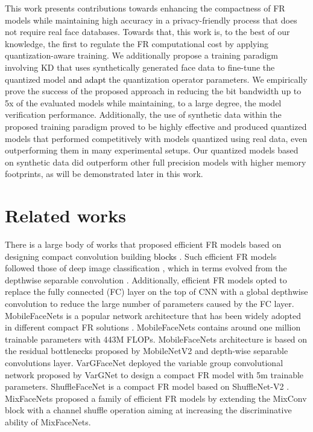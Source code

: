\documentclass[a4paper,conference]{IEEEtran}
\begin{document}
This work presents contributions towards enhancing the compactness of FR models while maintaining high accuracy in a privacy-friendly process that does not require real face databases. 
Towards that, this work is, to the best of our knowledge, the first to regulate the FR computational cost by applying quantization-aware training.
We additionally propose a training paradigm involving KD that uses synthetically generated face data to fine-tune the quantized model \textcolor{black}{and adapt} the quantization operator parameters.
We empirically prove the success of the proposed approach in reducing the bit bandwidth up to 5x of the evaluated models while maintaining, to a large degree, the model verification performance. 
Additionally, the use of synthetic data within the proposed training paradigm proved to be highly effective and produced quantized models that performed competitively with models quantized using real data, even outperforming them in many experimental setups.
Our quantized models based on synthetic data did outperform other full precision models with higher memory footprints, as will be demonstrated later in this work.







\vspace{-2mm}
\section{Related works}
\vspace{-1mm}
There is a large body of works that proposed efficient FR models based on designing compact convolution building \textcolor{black}{blocks} \cite{mobilefacenet,shufflefacenet,mixfacenet,vargfacenet}.  
Such efficient FR models followed those of deep image classification \cite{mixnet,mobilenetv2,shufflenetv2}, which in terms evolved from the depthwise separable convolution \cite{xception}. 
Additionally, efficient FR models \cite{mobilefacenet,shufflefacenet,mixfacenet,vargfacenet} opted to replace the fully connected (FC) layer on the top of CNN with a global depthwise convolution to reduce the large number of parameters caused by the FC layer.
MobileFaceNets \cite{mobilefacenet} is a popular network architecture that has been widely adopted in different compact FR solutions \cite{airface,DBLP:conf/iccvw/DengGZDLS19}.
MobileFaceNets contains around one million trainable parameters with 443M FLOPs. 
MobileFaceNets architecture is based on the residual bottlenecks proposed by MobileNetV2 \cite{mobilenetv2} and depth-wise separable convolutions layer.
VarGFaceNet \cite{vargfacenet} deployed the variable group convolutional network proposed by VarGNet \cite{vargnet} to design a compact FR model with 5m trainable parameters. ShuffleFaceNet \cite{shufflefacenet} is a compact FR model based on ShuffleNet-V2 \cite{shufflenetv2}. 
MixFaceNets \cite{mixfacenet} proposed a family of efficient FR models by extending the MixConv block \cite{mixnet} with a channel shuffle operation \cite{shufflenetv2} aiming at increasing the discriminative ability of MixFaceNets.
\end{document}
